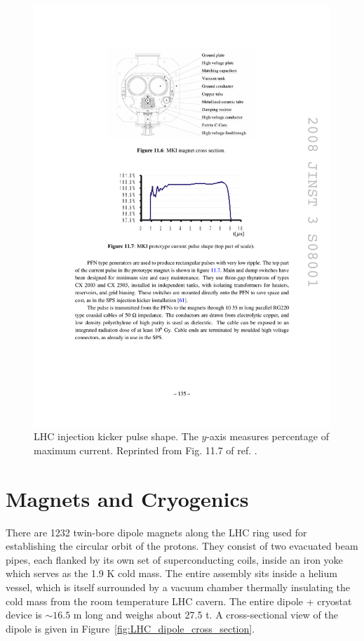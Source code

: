 \documentclass[dissertation.tex]{subfiles}
\begin{document}
\begin{figure}
	\centering
	\includegraphics[scale=1.0]{MKI_pulse}
	\caption{LHC injection kicker pulse shape.  The $y$-axis measures percentage of maximum current.  Reprinted from Fig. 11.7 of ref. \cite{1748-0221-3-08-S08001}.}
	\label{fig:MKI_pulse}
\end{figure}

\section{Magnets and Cryogenics}
\label{sec:Magnets and Cryogenics}

There are 1232 twin-bore dipole magnets along the LHC ring used for establishing the circular orbit of the protons.  They consist of two evacuated beam pipes, each flanked by its own set of superconducting coils, inside an iron yoke which serves as the 1.9 K cold mass.  The entire assembly sits inside a helium vessel, which is itself surrounded by a vacuum chamber thermally insulating the cold mass from the room temperature LHC cavern.  The entire dipole + cryostat device is $\sim16.5$ m long and weighs about 27.5 t.  A cross-sectional view of the dipole is given in Figure~\ref{fig:LHC_dipole_cross_section}.
\end{document}
